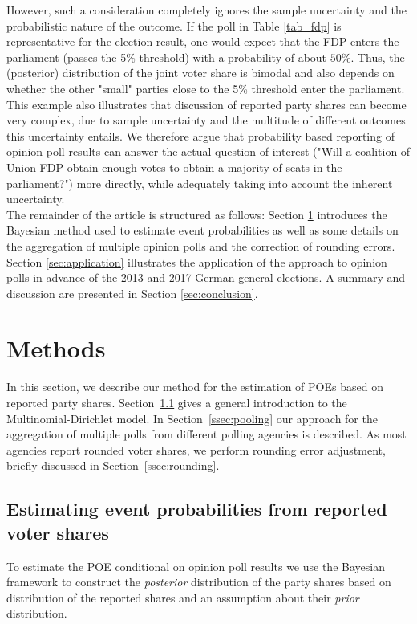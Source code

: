 \documentclass[smallcondensed]{svjour3}     %
\begin{document}
However, such a consideration completely ignores the sample uncertainty and the
probabilistic nature of the outcome. If the poll in Table \ref{tab_fdp} is representative for the election result, one would expect that the FDP enters the parliament (passes the 5\% threshold) with a
probability of about $50\%$. Thus, the (posterior) distribution of the joint voter
share is bimodal and also depends on whether the other "small" parties close to
the 5\% threshold enter the parliament. This example also illustrates that discussion
of reported party shares can become very complex, due to sample uncertainty
and the multitude of different outcomes this uncertainty entails.
We therefore argue that probability based reporting of opinion poll results can
answer the actual question of interest ("Will a coalition of Union-FDP obtain
enough votes to obtain a majority of seats in the parliament?") more directly, while
adequately taking into account the inherent uncertainty.\\

The remainder of the article is structured as follows: Section \ref{sec:methods}
introduces the Bayesian method used to estimate event probabilities as well
as some details on the aggregation of multiple opinion polls and the correction
of rounding errors. Section \ref{sec:application} illustrates the
application of the approach to opinion polls in advance of the  2013 and 2017
German general elections. A summary and discussion are presented in Section
\ref{sec:conclusion}.\\

\section{Methods}\label{sec:methods}
In this section, we describe our method for the estimation of POEs based on reported party shares. Section~\ref{ssec:bayes} gives a general introduction to the Multinomial-Dirichlet model. In Section~\ref{ssec:pooling} our approach for the aggregation of multiple polls from different polling agencies is described. As most agencies report rounded voter shares, we perform rounding
error adjustment, briefly discussed in Section~\ref{ssec:rounding}.

\subsection{Estimating event probabilities from reported voter shares} \label{ssec:bayes}
To estimate the POE conditional on opinion poll results
we use the Bayesian framework to construct the \emph{posterior} distribution of
the party shares based on distribution of the reported shares and an assumption
about their \emph{prior} distribution.\\
\end{document}
